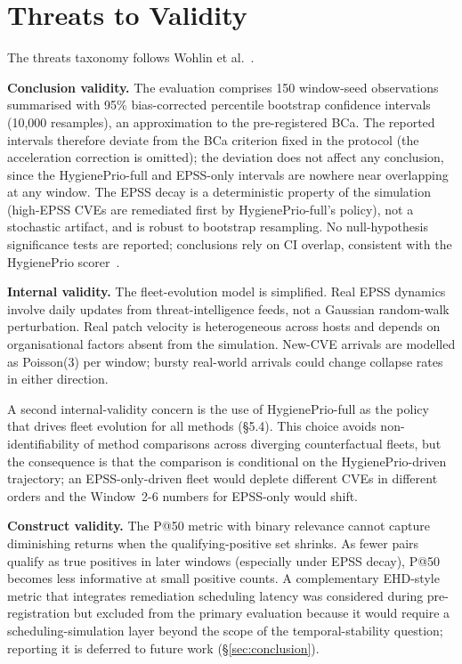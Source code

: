 \section{Threats to Validity}
\label{sec:threats}

The threats taxonomy follows Wohlin et al.~\cite{wohlin2012experimentation}.

\textbf{Conclusion validity.} The evaluation comprises 150 window-seed observations summarised with 95\% bias-corrected percentile bootstrap confidence intervals (10{,}000 resamples), an approximation to the pre-registered BCa. The reported intervals therefore deviate from the BCa criterion fixed in the protocol (the acceleration correction is omitted); the deviation does not affect any conclusion, since the HygienePrio-full and EPSS-only intervals are nowhere near overlapping at any window. The EPSS decay is a deterministic property of the simulation (high-EPSS CVEs are remediated first by HygienePrio-full's policy), not a stochastic artifact, and is robust to bootstrap resampling. No null-hypothesis significance tests are reported; conclusions rely on CI overlap, consistent with the HygienePrio scorer~\cite{paper4hygieneprio}.

\textbf{Internal validity.} The fleet-evolution model is simplified. Real EPSS dynamics involve daily updates from threat-intelligence feeds, not a Gaussian random-walk perturbation. Real patch velocity is heterogeneous across hosts and depends on organisational factors absent from the simulation. New-CVE arrivals are modelled as Poisson(3) per window; bursty real-world arrivals could change collapse rates in either direction.

A second internal-validity concern is the use of HygienePrio-full as the policy that drives fleet evolution for all methods (\S5.4). This choice avoids non-identifiability of method comparisons across diverging counterfactual fleets, but the consequence is that the comparison is conditional on the HygienePrio-driven trajectory; an EPSS-only-driven fleet would deplete different CVEs in different orders and the Window~2-6 numbers for EPSS-only would shift.

\textbf{Construct validity.} The P@50 metric with binary relevance cannot capture diminishing returns when the qualifying-positive set shrinks. As fewer pairs qualify as true positives in later windows (especially under EPSS decay), P@50 becomes less informative at small positive counts. A complementary EHD-style metric that integrates remediation scheduling latency was considered during pre-registration but excluded from the primary evaluation because it would require a scheduling-simulation layer beyond the scope of the temporal-stability question; reporting it is deferred to future work (\S\ref{sec:conclusion}).

